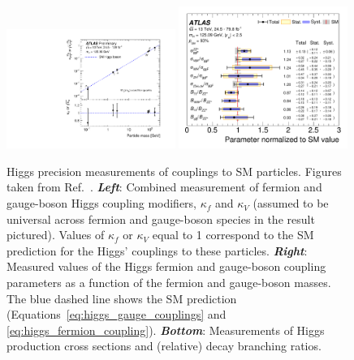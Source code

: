 \begin{figure}[!htb]
    \begin{center}
        \includegraphics[width=0.49\textwidth]{figures/chapter1/sm_final/higgs_kappa_vs_mass}
        \includegraphics[width=0.49\textwidth]{figures/chapter1/sm_final/higgs_prod_and_br}
        \caption{
            Higgs precision measurements of couplings to SM particles.
            Figures taken from Ref.~\cite{HiggsProps}.
            \textit{\textbf{Left}}: Combined measurement of fermion and gauge-boson Higgs coupling modifiers, $\kappa_f$
                and $\kappa_V$ (assumed to be universal across fermion and gauge-boson species in the result pictured).
                Values of $\kappa_f$ or $\kappa_V$ equal to 1 correspond to the SM prediction for the Higgs' couplings to
                these particles.
            \textit{\textbf{Right}}: Measured values of the Higgs fermion and gauge-boson coupling parameters
                as a function of the fermion and gauge-boson masses.
                The blue dashed line shows the SM prediction (Equations~\ref{eq:higgs_gauge_couplings} and \ref{eq:higgs_fermion_coupling}).
            \textit{\textbf{Bottom}}: Measurements of Higgs production cross sections and (relative) decay branching ratios.
        }
        \label{fig:higgs_measurements}
    \end{center}
\end{figure}

